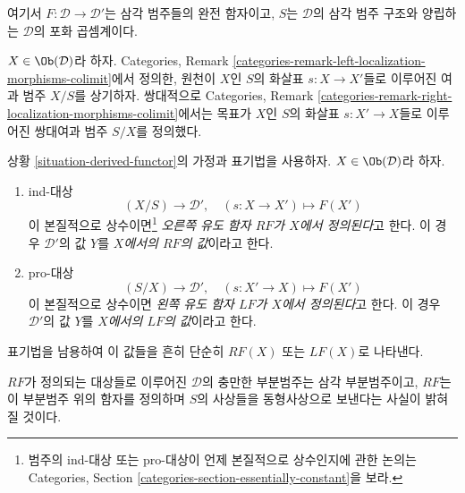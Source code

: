 \begin{situation}
\label{situation-derived-functor}
여기서 $F : \mathcal{D} \to \mathcal{D}'$는 삼각 범주들의 완전 함자이고,
$S$는 $\mathcal{D}$의 삼각 범주 구조와 양립하는 $\mathcal{D}$의 포화
곱셈계이다.
\end{situation}

\noindent
$X \in \Ob(\mathcal{D})$라 하자. Categories, Remark
\ref{categories-remark-left-localization-morphisms-colimit}에서 정의한,
원천이 $X$인 $S$의 화살표 $s : X \to X'$들로 이루어진 여과 범주
$X/S$를 상기하자. 쌍대적으로 Categories, Remark
\ref{categories-remark-right-localization-morphisms-colimit}에서는
목표가 $X$인 $S$의 화살표 $s : X' \to X$들로 이루어진 쌍대여과 범주
$S/X$를 정의했다.

\begin{definition}
\label{definition-right-derived-functor-defined}
상황 \ref{situation-derived-functor}의 가정과 표기법을 사용하자.
$X \in \Ob(\mathcal{D})$라 하자.
\begin{enumerate}
\item ind-대상
$$
(X/S) \longrightarrow \mathcal{D}', \quad
(s : X \to X') \longmapsto F(X')
$$
이 본질적으로 상수이면\footnote{범주의 ind-대상 또는 pro-대상이 언제
본질적으로 상수인지에 관한 논의는 Categories, Section
\ref{categories-section-essentially-constant}을 보라.}
{\it 오른쪽 유도 함자 $RF$가 $X$에서 정의된다}고 한다. 이 경우
$\mathcal{D}'$의 값 $Y$를 {\it $X$에서의 $RF$의 값}이라고 한다.
\item pro-대상
$$
(S/X) \longrightarrow \mathcal{D}', \quad
(s: X' \to X) \longmapsto F(X')
$$
이 본질적으로 상수이면 {\it 왼쪽 유도 함자 $LF$가 $X$에서 정의된다}고
한다. 이 경우 $\mathcal{D}'$의 값 $Y$를 {\it $X$에서의 $LF$의 값}이라고
한다.
\end{enumerate}
표기법을 남용하여 이 값들을 흔히 단순히 $RF(X)$ 또는 $LF(X)$로 나타낸다.
\end{definition}

\noindent
$RF$가 정의되는 대상들로 이루어진 $\mathcal{D}$의 충만한 부분범주는
삼각 부분범주이고, $RF$는 이 부분범주 위의 함자를 정의하며 $S$의 사상들을
동형사상으로 보낸다는 사실이 밝혀질 것이다.

